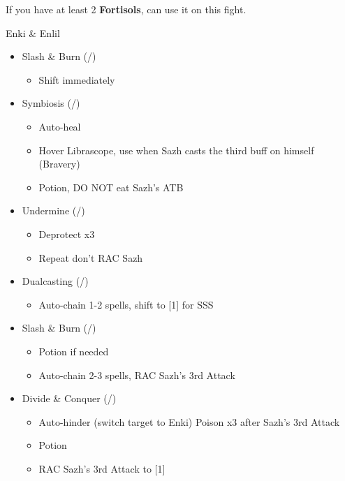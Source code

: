 If you have at least 2 \textbf{Fortisols}, can use it on this fight.
\vfill
\ 

\renewcommand{\first}{[1] Slash \& Burn (\rav/\com)}
\renewcommand{\second}{[2] Symbiosis (\med/\syn)}
\renewcommand{\third}{[3] Tide Turner (\sab/\syn)}
\renewcommand{\fourth}{[4] Dualcasting (\rav/\rav)}
\renewcommand{\fifth}{[5] Undermine (\sab/\rav)}
\renewcommand{\sixth}{[6] Divide \& Conquer (\sab/\com)}
\begin{battle}[1:39]{Enki \& Enlil}
		\begin{itemize}
			\item \first
			      \begin{itemize}
				      \item Shift immediately
			      \end{itemize}
			\item \second
			      \begin{itemize}
			      	  \item Auto-heal
				      \item Hover Librascope, use when Sazh casts the third buff on himself (Bravery)
				      \item Potion, DO NOT eat Sazh's ATB
			      \end{itemize}
			\item \fifth
			      \begin{itemize}
				      \item Deprotect x3
				      \item Repeat don't RAC Sazh
			      \end{itemize}
			\item \fourth
			      \begin{itemize}
				      \item Auto-chain 1-2 spells, shift to [1] for SSS
			      \end{itemize}
			\item \first
			      \begin{itemize}
				      \item Potion if needed
				      \item Auto-chain 2-3 spells, RAC Sazh's 3rd Attack
			      \end{itemize}
			\item \sixth
			      \begin{itemize}
				      \item Auto-hinder (switch target to Enki) Poison x3 after Sazh's 3rd Attack
				      \item Potion
				      \item RAC Sazh's 3rd Attack to [1]

\end{itemize}
\end{itemize}
\end{battle}
